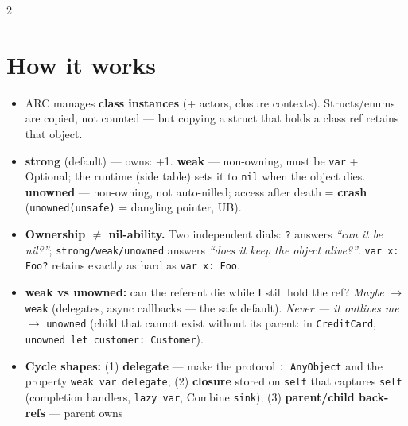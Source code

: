 \documentclass[8pt]{extarticle}
\begin{document}


\begin{multicols}{2}
\raggedright

\section{How it works}
\begin{itemize}
  \item ARC manages \textbf{class instances} (+ actors, closure contexts).
        Structs/enums are copied, not counted — but copying a struct that
        holds a class ref retains that object.
  \item \textbf{strong} (default) — owns: +1. \textbf{weak} — non-owning, must be
        \texttt{var} + Optional; the runtime (side table) sets it to
        \texttt{nil} when the object dies. \textbf{unowned} — non-owning, not
        auto-nilled; access after death = \textbf{crash} (\texttt{unowned(unsafe)}
        = dangling pointer, UB).
  \item \textbf{Ownership $\neq$ nil-ability.} Two independent dials:
        \texttt{?} answers \emph{``can it be nil?''};
        \texttt{strong/weak/unowned} answers \emph{``does it keep the object
        alive?''}. \texttt{var x: Foo?} retains exactly as hard as
        \texttt{var x: Foo}.
  \item \textbf{weak vs unowned:} can the referent die while I still hold the
        ref? \emph{Maybe} $\to$ \texttt{weak} (delegates, async callbacks —
        the safe default). \emph{Never — it outlives me} $\to$
        \texttt{unowned} (child that cannot exist without its parent:
        in \texttt{CreditCard}, \texttt{unowned let customer: Customer}).
  \item \textbf{Cycle shapes:} (1) \textbf{delegate} — make the protocol
        \texttt{: AnyObject} and the property \texttt{weak var delegate};
        (2) \textbf{closure} stored on \texttt{self} that captures
        \texttt{self} (completion handlers, \texttt{lazy var}, Combine
        \texttt{sink}); (3) \textbf{parent/child back-refs} — parent owns

\end{itemize}
\end{multicols}
\end{document}
